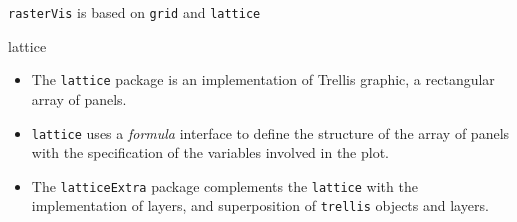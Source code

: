 \documentclass[xcolor={usenames,svgnames,dvipsnames}]{beamer}
\begin{document}
\begin{frame}[fragile,label=sec-6]{\texttt{rasterVis} is based on \texttt{grid} and \texttt{lattice}}
 \begin{block}{lattice}
\begin{itemize}
\item The \texttt{lattice} package is an implementation of Trellis graphic, a
rectangular array of panels.

\item \texttt{lattice} uses a \emph{formula} interface to define the structure of the
array of panels with the specification of the variables involved in
the plot.

\item The \texttt{latticeExtra} package complements the \texttt{lattice} with the
implementation of layers, and superposition of \texttt{trellis} objects and
layers.
\end{itemize}
\end{block}
\end{frame}
\end{document}

